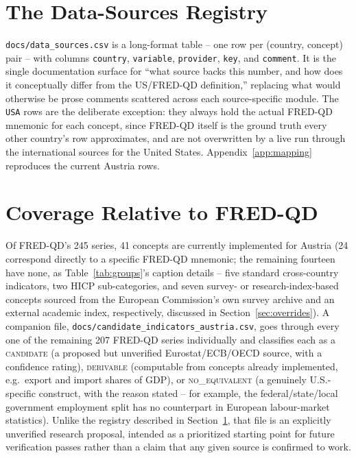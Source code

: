 \documentclass[11pt]{article}
\begin{document}
\section{The Data-Sources Registry}
\label{sec:registry}

\texttt{docs/data\_sources.csv} is a long-format table -- one row per
(country, concept) pair -- with columns \texttt{country}, \texttt{variable},
\texttt{provider}, \texttt{key}, and \texttt{comment}. It is the single
documentation surface for ``what source backs this number, and how does it
conceptually differ from the US/FRED-QD definition,'' replacing what would
otherwise be prose comments scattered across each source-specific module.
The \texttt{USA} rows are the deliberate exception: they always hold the
actual FRED-QD mnemonic for each concept, since FRED-QD itself is the
ground truth every other country's row approximates, and are not
overwritten by a live run through the international sources for the United
States. Appendix~\ref{app:mapping} reproduces the current Austria rows.

\section{Coverage Relative to FRED-QD}
\label{sec:coverage}

Of FRED-QD's 245 series, 41 concepts are currently implemented for Austria
(24 correspond directly to a specific FRED-QD mnemonic; the remaining
fourteen have none, as Table~\ref{tab:groups}'s caption details -- five
standard cross-country indicators, two HICP sub-categories, and seven
survey- or research-index-based concepts sourced from the European
Commission's own survey archive and an external academic index,
respectively, discussed in Section~\ref{sec:overrides}). A companion
file, \texttt{docs/\allowbreak{}candidate\_\allowbreak{}indicators\_\allowbreak{}austria.csv}, goes
through every one of the remaining 207 FRED-QD series individually and
classifies each as a \textsc{candidate} (a proposed but unverified
Eurostat/ECB/OECD source, with a confidence rating), \textsc{derivable}
(computable from concepts already implemented, e.g.\ export and import
shares of GDP), or \textsc{no\_equivalent} (a genuinely U.S.-specific
construct, with the reason stated -- for example, the federal/state/local
government employment split has no counterpart in European labour-market
statistics). Unlike the registry described in Section~\ref{sec:registry},
that file is an explicitly unverified research proposal, intended as a
prioritized starting point for future verification passes rather than a
claim that any given source is confirmed to work.
\end{document}
